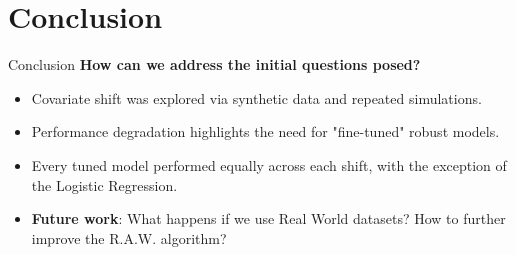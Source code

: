 \section{Conclusion}
\begin{frame}{Conclusion}
    \centering
    \Large
    \textbf{How can we address the initial questions posed?} 
    \large
    \vspace{0.1em}
    \begin{itemize}
        \item Covariate shift was explored via synthetic data and repeated simulations.
        \item Performance degradation highlights the need for "fine-tuned" robust models.
        \item Every tuned model performed equally across each shift, with the exception of the Logistic Regression.
        \item \textbf{Future work}: What happens if we use Real World datasets?
        How to further improve the R.A.W. algorithm?
    \end{itemize}
\end{frame}